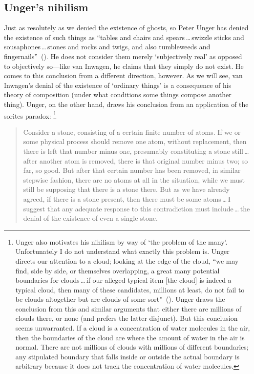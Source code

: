 \documentclass[11pt]{article}
\newenvironment{squote}{\begin{quote}\begin{singlespace}}{\end{singlespace}\end{quote}}
\begin{document}
\begin{spacing}{1.5}
\subsection{Unger's nihilism}
\label{unger}
Just as resolutely as we denied the existence of ghosts, so Peter Unger has denied the existence of such things as ``tables and chairs and spears\,\ldots\,swizzle sticks and sousaphones\,\ldots\,stones and rocks and twigs, and also tumbleweeds and fingernails''~(\citeyear[117]{unger1979}). He does not consider them merely `subjectively real' as opposed to objectively so---like van Inwagen, he claims that they simply do not exist. He comes to this conclusion from a different direction, however. As we will see, van Inwagen's denial of the existence of `ordinary things' is a consequence of his theory of composition (under what conditions some things compose another thing). Unger, on the other hand, draws his conclusion from an application of the sorites paradox:%
%
\footnote{Unger also motivates his nihilism by way of `the problem of the many'. Unfortunately I do not understand what exactly this problem is. Unger directs our attention to a cloud; looking at the edge of the cloud, ``we may find, side by side, or themselves overlapping, a great many potential boundaries for clouds\,\ldots\,if our alleged typical item [the cloud] is indeed a typical cloud, then many of these candidates, millions at least, do not fail to be clouds altogether but are clouds of some sort''~(\citeyear[420--421]{unger1980a}). Unger draws the conclusion from this and similar arguments that either there are millions of clouds there, or none (and prefers the latter disjunct). But this conclusion seems unwarranted. If a cloud is a concentration of water molecules in the air, then the boundaries of the cloud are where the amount of water in the air is normal. There are not millions of clouds with millions of different boundaries; any stipulated boundary that falls inside or outside the actual boundary is arbitrary because it does not track the concentration of water molecules.}
%
\begin{squote}
Consider a stone, consisting of a certain finite number of atoms. If we or some physical process should remove one atom, without replacement, then there is left that number minus one, presumably constituting a stone still\,\ldots\,after another atom is removed, there is that original number minus two; so far, so good. But after that certain number has been removed, in similar stepwise fashion, there are no atoms at all in the situation, while we must still be supposing that there is a stone there. But as we have already agreed, if there is a stone present, then there must
be some atoms\,\ldots\,I suggest that any adequate response to this contradiction must include\,\ldots\,the denial of the existence of even a single stone.~\citep[121--122]{unger1979}
\end{squote}


\end{spacing}
\end{document}

